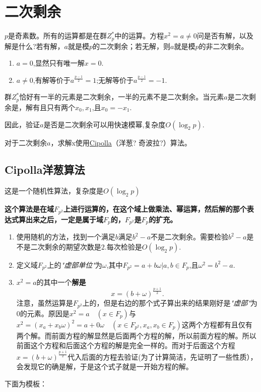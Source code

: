 \section{二次剩余}
\par $p$是奇素数。所有的运算都是在群$Z_{p}^{*}$中的运算。方程$x^2=a \neq 0$问是否有解，以及解是什么?若有解，$a$就是模$p$的二次剩余；若无解，则$a$就是模$p$的非二次剩余。
\begin{enumerate}
	\item $a=0$,显然只有唯一解$x=0$.
	\item $a\neq 0$,有解等价于$a^{\frac{p-1}{2}}=1$;无解等价于$a^{\frac{p-1}{2}}=-1$.
\end{enumerate}
\par 群$Z_{p}^{*}$恰好有一半的元素是二次剩余，一半的元素不是二次剩余。当元素$a$是二次剩余是，解有且只有两个$x_0,x_1$,且$x_0=-x_1$.
\par 因此，验证$a$是否是二次剩余可以用快速模幂,复杂度$O(\log_2{p})$.
\par 对于二次剩余$a$，求解x使用\underline{Cipolla}（洋葱? 奇波拉?）算法。
\subsection{Cipolla洋葱算法}
\par 这是一个随机性算法，复杂度是$O(\log_2{p})$
\par {\bfseries 这个算法是在域$F_{p^2}$上进行运算的，在这个域上做乘法、幂运算，然后解的那个表达式算出来之后，一定是属于域$F_{p}$的，$F_{p^2}$是$F_{p}$的扩充。}
\begin{enumerate}
	\item 使用随机的方法，找到一个满足$b$满足$b^2-a$不是二次剩余。需要检验$b^2-a$是不是二次剩余的期望次数是$2$.每次检验是$O(\log_2{p})$.
	\item 定义域$F_{p^2}$上的\textit{"虚部单位"}为$\omega$,其中$F_{p^2}={a+b\omega| a,b \in F_p}$,且$\omega^2=b^2-a$.
	\item $x^2=a$的其中一个{\bfseries 解是$$x=(b+\omega)^{\frac{p+1}{2}}.$$}注意，虽然运算是$F_{p^2}$上的，但是右边的那个式子算出来的结果刚好是\textit{"虚部"}为0的元素。原因是$x^2=a \quad (x \in F_p)$与$x^2=(x_a+x_b\omega)^2=a+0\omega  \quad  (x \in F_{p^2},x_a,x_b \in F_p)$这两个方程都有且仅有两个解。而前面方程的解显然是后面两个方程的解，所以前面方程的解。所以前面这个方程和后面这个方程的解是完全一样的。而对于后面这个方程$x=(b+\omega)^{\frac{p+1}{2}}$代入后面的方程去验证(为了计算简洁，先证明了一些性质），会发现它的确是解，于是这个式子就是一开始方程的解。
\end{enumerate}
\par 下面为模板：
